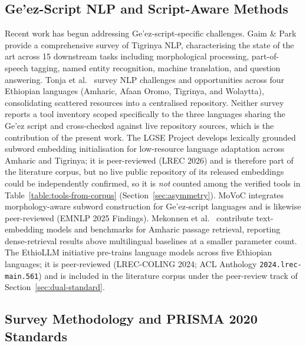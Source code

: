 \documentclass[sn-mathphys-num]{sn-jnl}
\theoremstyle{thmstyleone}
\theoremstyle{thmstyletwo}
\theoremstyle{thmstylethree}
\begin{document}
\subsection{Ge'ez-Script NLP and Script-Aware Methods}

Recent work has begun addressing Ge'ez-script-specific challenges. Gaim \& Park \citep{gaim_tigrinya_2025} provide a comprehensive survey of Tigrinya NLP, characterising the state of the art across 15 downstream tasks including morphological processing, part-of-speech tagging, named entity recognition, machine translation, and question answering. Tonja et al.\ \citep{tonja_natural_2023} survey NLP challenges and opportunities across four Ethiopian languages (Amharic, Afaan Oromo, Tigrinya, and Wolaytta), consolidating scattered resources into a centralised repository. Neither survey reports a tool inventory scoped specifically to the three languages sharing the Ge'ez script and cross-checked against live repository sources, which is the contribution of the present work.
The LGSE Project \citep{teklehaymanot_lgse_2026} develops lexically grounded subword embedding initialisation for low-resource language adaptation across Amharic and Tigrinya; it is peer-reviewed (LREC 2026) and is therefore part of the literature corpus, but no live public repository of its released embeddings could be independently confirmed, so it is \emph{not} counted among the verified tools in Table~\ref{table:tools-from-corpus} (Section~\ref{sec:asymmetry}). MoVoC \citep{teklehaymanot_movoc_2025} integrates morphology-aware subword construction for Ge'ez-script languages and is likewise peer-reviewed (EMNLP 2025 Findings). Mekonnen et al.\ \citep{mekonnen_optimized_2025} contribute text-embedding models and benchmarks for Amharic passage retrieval, reporting dense-retrieval results above multilingual baselines at a smaller parameter count. The EthioLLM initiative \citep{tonja_ethiollm_2024} pre-trains language models across five Ethiopian languages; it is peer-reviewed (LREC-COLING 2024; ACL Anthology \texttt{2024.lrec-main.561}) and is included in the literature corpus under the peer-review track of Section~\ref{sec:dual-standard}.

\subsection{Survey Methodology and PRISMA 2020 Standards}
\end{document}
